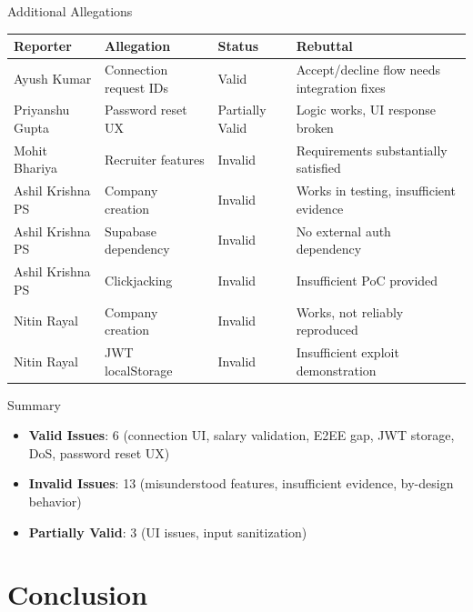 \documentclass[aspectratio=169]{beamer}
\begin{document}
\begin{frame}[fragile]{Additional Allegations}
\renewcommand{\arraystretch}{1.2}
\scriptsize
\begin{tabular}{|p{2.8cm}|p{4cm}|p{1.5cm}|p{5.5cm}|}
\hline
\textbf{Reporter} & \textbf{Allegation} & \textbf{Status} & \textbf{Rebuttal} \\
\hline
Ayush Kumar & Connection request IDs & Valid & Accept/decline flow needs integration fixes \\
\hline
Priyanshu Gupta & Password reset UX & Partially Valid & Logic works, UI response broken \\
\hline
Mohit Bhariya & Recruiter features & Invalid & Requirements substantially satisfied \\
\hline
Ashil Krishna PS & Company creation & Invalid & Works in testing, insufficient evidence \\
\hline
Ashil Krishna PS & Supabase dependency & Invalid & No external auth dependency \\
\hline
Ashil Krishna PS & Clickjacking & Invalid & Insufficient PoC provided \\
\hline
Nitin Rayal & Company creation & Invalid & Works, not reliably reproduced \\
\hline
Nitin Rayal & JWT localStorage & Invalid & Insufficient exploit demonstration \\
\hline
\hline
\end{tabular}

\vspace{0.3cm}
\begin{block}{Summary}
\begin{itemize}
    \item \textbf{Valid Issues}: 6 (connection UI, salary validation, E2EE gap, JWT storage, DoS, password reset UX)
    \item \textbf{Invalid Issues}: 13 (misunderstood features, insufficient evidence, by-design behavior)
    \item \textbf{Partially Valid}: 3 (UI issues, input sanitization)
\end{itemize}
\end{block}
\end{frame}

\section{Conclusion}
\end{document}
